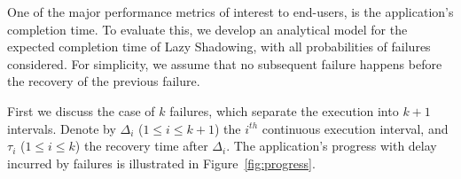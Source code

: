 One of the major performance metrics of interest to end-users, is the application's completion time. 
To evaluate this, we develop an analytical model for the expected completion time of Lazy Shadowing, with all probabilities of failures considered. For simplicity, we assume that no subsequent failure happens before the recovery of the previous failure. 

First we discuss the case of $k$ failures, which separate the execution into $k+1$ intervals. 
Denote by $\Delta_i$ ($1\le i \le k+1$) the $i^{th}$ continuous execution interval, and $\tau_i$ ($1\le i \le k$) the recovery time after $\Delta_i$. 
The application's progress with delay incurred by failures is illustrated in Figure~\ref{fig:progress}.

